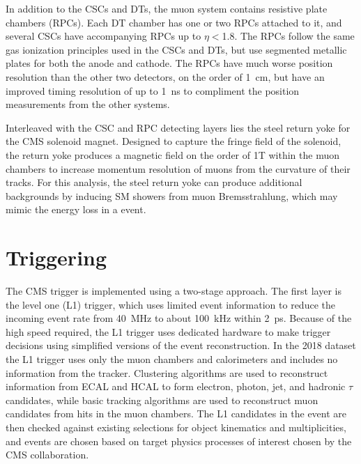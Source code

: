 In addition to the CSCs and DTs, the muon system contains resistive plate chambers (RPCs). 
Each DT chamber has one or two RPCs attached to it, and several CSCs have accompanying RPCs up to $\eta<$1.8. 
The RPCs follow the same gas ionization principles used in the CSCs and DTs, but use segmented metallic plates for both the anode and cathode.
The RPCs have much worse position resolution than the other two detectors, on the order of \SI{1}{\centi\meter}, but have an improved timing resolution of up to \SI{1}{\nano\second} to compliment the position measurements from the other systems.

Interleaved with the CSC and RPC detecting layers lies the steel return yoke for the CMS solenoid magnet.
Designed to capture the fringe field of the solenoid, the return yoke produces a magnetic field on the order of 1T within the muon chambers to increase momentum resolution of muons from the curvature of their tracks.
For this analysis, the steel return yoke can produce additional backgrounds by inducing SM showers from muon Bremsstrahlung, which may mimic the energy loss in a \dbrem event.

\section{Triggering}
The CMS trigger is implemented using a two-stage approach. The first layer is the level one (L1) trigger, which uses limited event information to reduce the incoming event rate from \SI{40}{\mega\hertz} to about \SI{100}{\kilo\hertz} within \SI{2}{\pico\second}. 
Because of the high speed required, the L1 trigger uses dedicated hardware to make trigger decisions using simplified versions of the event reconstruction.
In the 2018 dataset the L1 trigger uses only the muon chambers and calorimeters and includes no information from the tracker.
Clustering algorithms are used to reconstruct information from ECAL and HCAL to form electron, photon, jet, and hadronic $\tau$ candidates, while basic tracking algorithms are used to reconstruct muon candidates from hits in the muon chambers.
The L1 candidates in the event are then checked against existing selections for object kinematics and multiplicities, and events are chosen based on target physics processes of interest chosen by the CMS collaboration.

